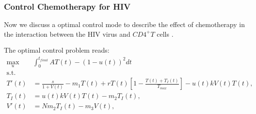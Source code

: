 \subsubsection*{Control Chemotherapy for HIV} 
	Now we discuss a optimal control mode to describe the effect of chemotherapy
in the interaction between the HIV virus and $CD4^+T$ cells 
\cite{butler1997optimal}.


The optimal control problem reads:
\begin{equation} \label{eqn:hiv_infect}
	\begin{aligned}
		\max_{u} & \int_{0}^{t_{final}}
			A  T(t) - (1-u(t)) ^ 2 dt
		\\
		\text{s.t. }
		\\
			T'(t) &=
				\frac{s}{1 + V(t)}
				- m_1 T(t) 
				+ r T(t)
				\left[
					1 - \frac{T(t)+ T_{I}(t)}{T_{max}}
				\right] 
				- u(t) k V(t) T(t),
			\\
			T_{I}(t) &=
				u(t) k V(t) T(t) - m_2 T_{I}(t),
			\\
			V'(t) &= N m_2 T_{I}(t) - m_3 V(t),
			\\
	\end{aligned}
\end{equation}


